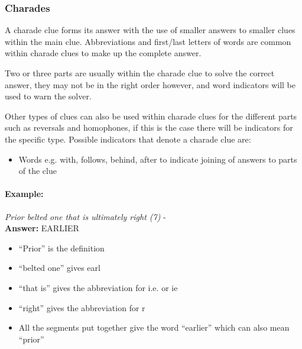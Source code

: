\subsubsection{Charades}

A charade clue forms its answer with the use of smaller answers to smaller clues
within the main clue. Abbreviations and first/last letters of words are common
within charade clues to make up the complete answer.

Two or three parts are usually within the charade clue to solve the correct
answer, they may not be in the right order however, and word indicators will be
used to warn the solver. 

Other types of clues can also be used within charade clues for the different
parts such as reversals and homophones, if this is the case there will be
indicators for the specific type. Possible  indicators that denote a charade
clue are:

\begin{itemize}
    \item Words e.g. with, follows, behind, after to indicate joining of 
    answers to parts of the clue 
\end{itemize}

\paragraph{Example:} \emph{Prior belted one that is ultimately right (7)} - \citep{shuchiCharades08} \\
\textbf{Answer:} EARLIER

\begin{itemize}
    \item ``Prior'' is the definition 
    \item ``belted one'' gives earl 
    \item ``that is'' gives the abbreviation for i.e. or ie 
    \item ``right'' gives the abbreviation for r 
    \item All the segments put together give the word ``earlier'' which can 
    also mean ``prior''
\end{itemize}
